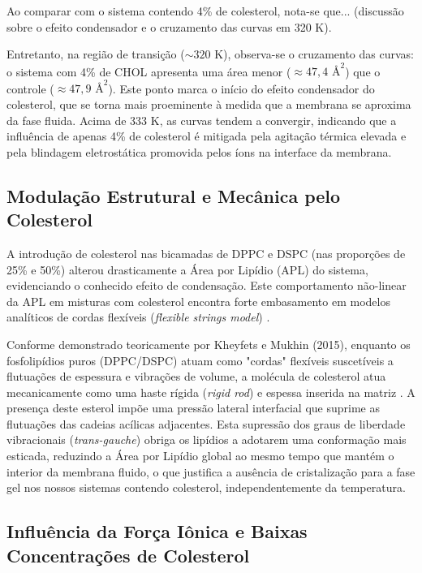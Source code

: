 \documentclass[12pt]{article} %
\begin{document}
Ao comparar com o sistema contendo 4\% de colesterol, nota-se que... (discussão sobre o efeito condensador e o cruzamento das curvas em 320 K).

Entretanto, na região de transição ($\sim 320$ K), observa-se o cruzamento das curvas: o sistema com 4\% de CHOL apresenta uma área menor ($\approx 47,4 \text{ \AA}^2$) que o controle ($\approx 47,9 \text{ \AA}^2$). Este ponto marca o início do efeito condensador do colesterol, que se torna mais proeminente à medida que a membrana se aproxima da fase fluida. Acima de 333 K, as curvas tendem a convergir, indicando que a influência de apenas 4\% de colesterol é mitigada pela agitação térmica elevada e pela blindagem eletrostática promovida pelos íons na interface da membrana.

\subsection{Modulação Estrutural e Mecânica pelo Colesterol}

A introdução de colesterol nas bicamadas de DPPC e DSPC (nas proporções de 25\% e 50\%) alterou drasticamente a Área por Lipídio (APL) do sistema, evidenciando o conhecido efeito de condensação. Este comportamento não-linear da APL em misturas com colesterol encontra forte embasamento em modelos analíticos de cordas flexíveis (\textit{flexible strings model}) \cite{kheyfets2015}.

Conforme demonstrado teoricamente por Kheyfets e Mukhin (2015), enquanto os fosfolipídios puros (DPPC/DSPC) atuam como "cordas" flexíveis suscetíveis a flutuações de espessura e vibrações de volume, a molécula de colesterol atua mecanicamente como uma haste rígida (\textit{rigid rod}) e espessa inserida na matriz \cite{kheyfets2015}. A presença deste esterol impõe uma pressão lateral interfacial que suprime as flutuações das cadeias acílicas adjacentes. Esta supressão dos graus de liberdade vibracionais (\textit{trans-gauche}) obriga os lipídios a adotarem uma conformação mais esticada, reduzindo a Área por Lipídio global ao mesmo tempo que mantém o interior da membrana fluido, o que justifica a ausência de cristalização para a fase gel nos nossos sistemas contendo colesterol, independentemente da temperatura.

\subsection{Influência da Força Iônica e Baixas Concentrações de Colesterol}
\end{document}

